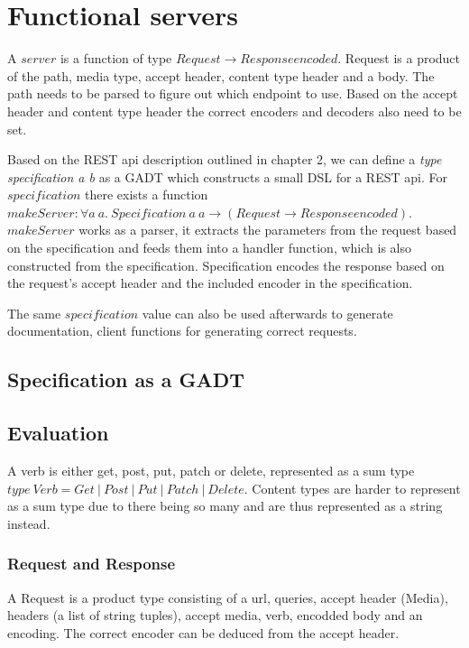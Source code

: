 \section{Functional servers}

A $server$ is a function of type $Request \rightarrow Response encoded$.
Request is a product of the path, media type, accept header, content type header
and a body. The path needs to be parsed to figure out which endpoint to use.
Based on the accept header and content type header the correct encoders and
decoders also need to be set.

Based on the REST api description outlined in chapter 2, we can define a
\textit{type specification a b} as a GADT which constructs a small DSL for a
REST api. For $specification$ there exists a function $makeServer : \forall a\
a.\ Specification\ a\ a \rightarrow (Request \rightarrow Response encoded)$.
$makeServer$ works as a parser, it extracts the parameters from the request
based on the specification and feeds them into a handler function, which is also
constructed from the specification. Specification encodes the response based on
the request's accept header and the included encoder in the specification.

The same $specification$ value can also be used afterwards to generate
documentation, client functions for generating correct requests.

\subsection{Specification as a GADT}

\subsection{Evaluation}

\theoremstyle{definition}

A verb is either get, post, put, patch or delete, represented as a sum type
$type\ Verb = Get\ |\ Post\ |\ Put\ |\ Patch\ |\
Delete$. Content types are harder to represent as a sum type due to there being
so many and are thus represented as a string instead.

\subsubsection{Request and Response}

A Request is a product type consisting of a url, queries, accept header (Media),
headers (a list of string tuples), accept media, verb, encodded body and an
encoding. The correct encoder can be deduced from the accept header.

